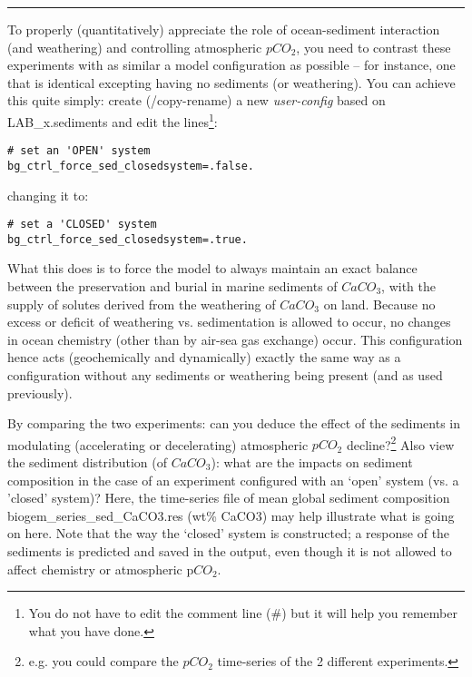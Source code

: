 \documentclass[11pt,fleqn]{book} %
\begin{document}
\vspace{1mm}
\noindent\rule{4cm}{0.1mm}
\vspace{2mm}

\vspace{16mm}
\pagebreak

\noindent To properly (quantitatively) appreciate the role of ocean-sediment interaction (and weathering) and controlling atmospheric \(pCO_{2}\), you need to contrast these experiments with as similar a model configuration as possible -- for instance, one that is identical excepting having no sediments (or weathering). You can achieve this quite simply: create (/copy-rename) a new \textit{user-config} based on \textsf{\footnotesize LAB\_x.sediments }and edit the lines\footnote{You do not have to edit the comment line (\#) but it will help you remember what you have done.}:
\vspace{-1mm}\small\begin{verbatim}
# set an 'OPEN' system
bg_ctrl_force_sed_closedsystem=.false.
\end{verbatim}\normalsize\vspace{-1mm}
changing it to: 
\vspace{-1mm}\small\begin{verbatim}
# set a 'CLOSED' system
bg_ctrl_force_sed_closedsystem=.true.
\end{verbatim}\normalsize\vspace{-1mm}

What this  does is to force the model to always maintain an exact balance between the preservation and burial in marine sediments of \(CaCO_{3}\), with the supply of solutes derived from the weathering of \(CaCO_{3}\) on land. Because no excess or deficit of  weathering vs. sedimentation is  allowed to occur, no changes in ocean chemistry (other than by air-sea gas exchange) occur. This configuration hence acts (geochemically and dynamically) exactly the same way as a configuration without any sediments or weathering being present (and as used previously).

By comparing the two experiments: can you deduce the effect of the sediments in modulating (accelerating or decelerating) atmospheric \(pCO_{2}\) decline?\footnote{e.g. you could compare the \(pCO_{2}\) time-series of the 2 different experiments.}  Also view the sediment distribution (of \(CaCO_{3}\)): what are the impacts on sediment composition in the case of an experiment configured with an ‘open’ system (vs. a 'closed' system)? Here, the time-series file of mean global sediment composition biogem\_series\_sed\_CaCO3.res (wt\% CaCO3) may help illustrate what is going on here.
Note that the way the ‘closed’ system is constructed; a response of the sediments is predicted and saved in the output, even though it is not allowed to affect chemistry or atmospheric p\(CO_{2}\).
\end{document}
